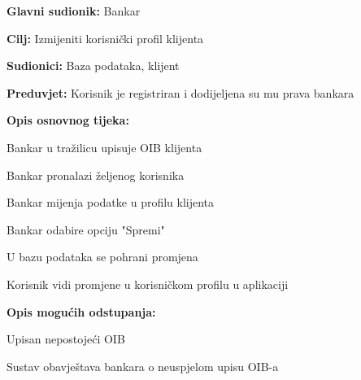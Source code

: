                 
                \noindent {}
                \begin{packed_item}
                
                  \item \textbf{Glavni sudionik: }Bankar
                  \item  \textbf{Cilj:} Izmijeniti korisnički profil klijenta 
                  \item  \textbf{Sudionici:} Baza podataka, klijent
                  \item  \textbf{Preduvjet:} Korisnik je registriran i dodijeljena su mu prava bankara
                  \item  \textbf{Opis osnovnog tijeka:}
                  
                  \item[] \begin{packed_enum}
                
                    \item  Bankar u tražilicu upisuje OIB klijenta
                    \item  Bankar pronalazi željenog korisnika
                    \item  Bankar mijenja podatke u profilu klijenta
                    \item  Bankar odabire opciju "Spremi"
                    \item  U bazu podataka se pohrani promjena                     
                    \item  Korisnik vidi promjene u korisničkom profilu u aplikaciji 
                  \end{packed_enum}
                  
                  \item  \textbf{Opis mogućih odstupanja:}
                  
                  \item[] \begin{packed_item}
                  	
                  	 \item[1.a] Upisan nepostojeći OIB
                  	\item[] \begin{packed_enum}
                  		
                  		\item Sustav obavještava bankara o neuspjelom upisu OIB-a 
                  		

\end{packed_enum}
\end{packed_item}
\end{packed_item}
